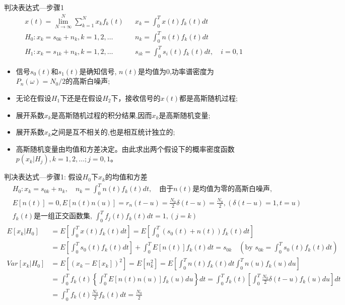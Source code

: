 \begin{frame}[shrink]{判决表达式---步骤1}
\begin{align*}
&x(t)=\lim\limits_{N\to\infty}^N\sum\limits_{k=1}^Nx_kf_k(t)&&x_k=\int_{0}^{T}x(t)f_k(t)dt \\
&H_0: x_k=s_{0k}+n_k,k=1,2,\dots &&n_k=\int_{0}^{T}n(t)f_k(t)dt\\
&H_1: x_k=s_{1k}+n_k,k=1,2,\dots &&s_{ik}=\int_{0}^{T}s_i(t)f_k(t)dt, \quad i=0,1
\end{align*}
\begin{itemize}
\item 信号$s_0(t)$和$s_1(t)$是确知信号, $n(t)$是均值为0,功率谱密度为$P_n(\omega)=N_0/2$的高斯白噪声;
\item 无论在假设$H_1$下还是在假设$H_2$下，接收信号的$x(t)$都是高斯随机过程;
\item 展开系数$x_k$是高斯随机过程的积分结果,因而$x_k$是高斯随机变量;
\item 展开系数$x_k$之间是互不相关的,也是相互统计独立的;
\item 高斯随机变量由均值和方差决定。由此求出两个假设下的概率密度函数$p(x_k|H_j),k=1,2,\dots;j=0,1$。
\end{itemize}
\end{frame}

\begin{frame}[shrink]{判决表达式---步骤1: 假设$H_0$下$x_k$的均值和方差}
\begin{align*}
&H_0: x_k=s_{0k}+n_k, \quad n_k=\int_{0}^{T}n(t)f_k(t)dt, \quad\text{由于$n(t)$是均值为零的高斯白噪声, }\\
&E[n(t)]=0, E[n(t)n(u)]=r_n(t-u) =\frac{N_0}{2}\delta(t-u)=\frac{N_0}{2},(\delta(t-u)=1,t=u)\\
&\text{$f_k(t)$是一组正交函数集, } \int_{0}^{T}f_j(t)f_k(t)dt=1,(j=k)
\end{align*}
\begin{align*}
E[x_k|H_0]&=E\left[\int_{0}^{T}x(t)f_k(t)dt\right]=E\left[\int_{0}^{T}(s_0(t)+n(t))f_k(t)dt\right]\\
&=E\left[\int_{0}^{T}s_0(t)f_k(t)dt\right]+\int_{0}^{T}E[n(t)]f_k(t)dt=s_{0k}\quad (\text{by }s_{0k}=\int_{0}^{T}s_0(t)f_k(t)dt)\\
Var[x_k|H_0]&=E[(x_k-E[x_k])^2]=E[n_k^2]=E\left[\int_{0}^{T}n(t)f_k(t)dt\int_{0}^{T}n(u)f_k(u)du\right]\\
&=\int_{0}^{T}f_k(t)\left\{\int_{0}^{T}E[n(t)n(u)]f_k(u)du\right\}dt=\int_{0}^{T}f_k(t)\left[\int_{0}^{T}\frac{N_0}{2}\delta(t-u)f_k(u)du\right]dt\\
&=\int_{0}^{T}f_k(t)\frac{N_0}{2}f_k(t)dt=\frac{N_0}{2}
\end{align*}
\end{frame}

